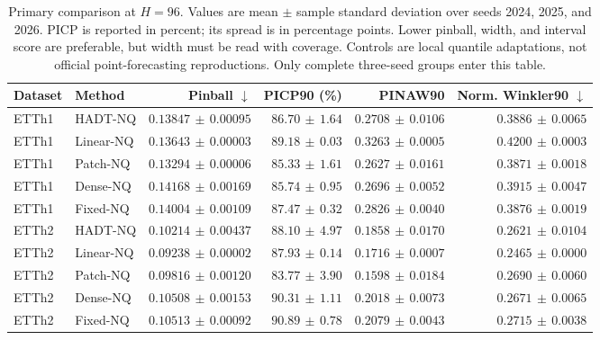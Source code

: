\begin{table}[t]
\caption{Primary comparison at $H=96$. Values are mean $\pm$ sample standard deviation over seeds 2024, 2025, and 2026. PICP is reported in percent; its spread is in percentage points. Lower pinball, width, and interval score are preferable, but width must be read with coverage. Controls are local quantile adaptations, not official point-forecasting reproductions. Only complete three-seed groups enter this table.}
\label{tab:main}
\centering
\small
\begin{tabular}{@{}llrrrr@{}}
\toprule
Dataset & Method & Pinball $\downarrow$ & PICP90 (\%) & PINAW90 & Norm. Winkler90 $\downarrow$ \\
\midrule
ETTh1 & HADT-NQ & $0.13847\,\pm\,0.00095$ & $86.70\,\pm\,1.64$ & $0.2708\,\pm\,0.0106$ & $0.3886\,\pm\,0.0065$ \\
ETTh1 & Linear-NQ & $0.13643\,\pm\,0.00003$ & $89.18\,\pm\,0.03$ & $0.3263\,\pm\,0.0005$ & $0.4200\,\pm\,0.0003$ \\
ETTh1 & Patch-NQ & $0.13294\,\pm\,0.00006$ & $85.33\,\pm\,1.61$ & $0.2627\,\pm\,0.0161$ & $0.3871\,\pm\,0.0018$ \\
ETTh1 & Dense-NQ & $0.14168\,\pm\,0.00169$ & $85.74\,\pm\,0.95$ & $0.2696\,\pm\,0.0052$ & $0.3915\,\pm\,0.0047$ \\
ETTh1 & Fixed-NQ & $0.14004\,\pm\,0.00109$ & $87.47\,\pm\,0.32$ & $0.2826\,\pm\,0.0040$ & $0.3876\,\pm\,0.0019$ \\
ETTh2 & HADT-NQ & $0.10214\,\pm\,0.00437$ & $88.10\,\pm\,4.97$ & $0.1858\,\pm\,0.0170$ & $0.2621\,\pm\,0.0104$ \\
ETTh2 & Linear-NQ & $0.09238\,\pm\,0.00002$ & $87.93\,\pm\,0.14$ & $0.1716\,\pm\,0.0007$ & $0.2465\,\pm\,0.0000$ \\
ETTh2 & Patch-NQ & $0.09816\,\pm\,0.00120$ & $83.77\,\pm\,3.90$ & $0.1598\,\pm\,0.0184$ & $0.2690\,\pm\,0.0060$ \\
ETTh2 & Dense-NQ & $0.10508\,\pm\,0.00153$ & $90.31\,\pm\,1.11$ & $0.2018\,\pm\,0.0073$ & $0.2671\,\pm\,0.0065$ \\
ETTh2 & Fixed-NQ & $0.10513\,\pm\,0.00092$ & $90.89\,\pm\,0.78$ & $0.2079\,\pm\,0.0043$ & $0.2715\,\pm\,0.0038$ \\
\bottomrule
\end{tabular}
\end{table}
